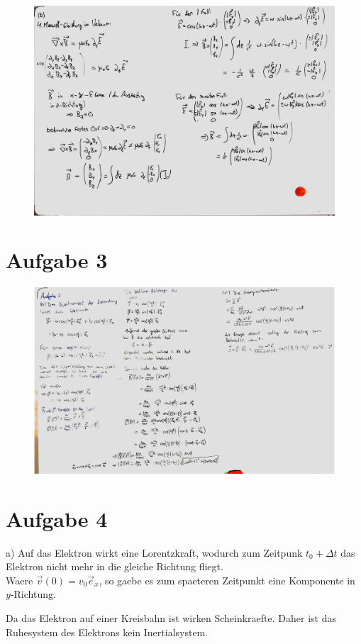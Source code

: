 \documentclass[11pt a4paper]{article}
\begin{document}
\begin{figure}[H]
	\centering
	\includegraphics[width=18cm]{aufgabe2b.jpg}
\end{figure}

\newpage

\section*{Aufgabe 3}

\begin{figure}[H]
	\centering
	\includegraphics[width=18cm]{aufgabe3.jpg}
\end{figure}

\newpage

\section*{Aufgabe 4}
\par{a)} Auf das Elektron wirkt eine Lorentzkraft, wodurch zum Zeitpunk $t_0 + \Delta t$ das Elektron nicht mehr
in die gleiche Richtung fliegt. \\
Waere $\vec v (0) = v_0 \vec e_x$, so gaebe es zum spaeteren Zeitpunkt eine Komponente in $y$-Richtung.

Da das Elektron auf einer Kreisbahn ist wirken Scheinkraefte. Daher ist das Ruhesystem des Elektrons kein
Inertialsystem.
\end{document}
